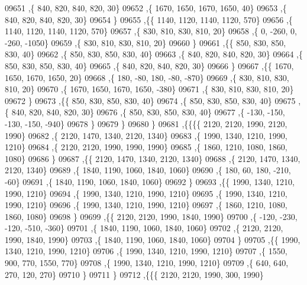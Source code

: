 \begin{DoxyCode}
09651     ,\{   840,   820,   840,   820,    30\}
09652     ,\{  1670,  1650,  1670,  1650,    40\}
09653     ,\{   840,   820,   840,   820,    30\}
09654     \}
09655    ,\{\{  1140,  1120,  1140,  1120,   570\}
09656     ,\{  1140,  1120,  1140,  1120,   570\}
09657     ,\{   830,   810,   830,   810,    20\}
09658     ,\{     0,  -260,     0,  -260, -1050\}
09659     ,\{   830,   810,   830,   810,    20\}
09660     \}
09661    ,\{\{   850,   830,   850,   830,    40\}
09662     ,\{   850,   830,   850,   830,    40\}
09663     ,\{   840,   820,   840,   820,    30\}
09664     ,\{   850,   830,   850,   830,    40\}
09665     ,\{   840,   820,   840,   820,    30\}
09666     \}
09667    ,\{\{  1670,  1650,  1670,  1650,    20\}
09668     ,\{   180,   -80,   180,   -80,  -870\}
09669     ,\{   830,   810,   830,   810,    20\}
09670     ,\{  1670,  1650,  1670,  1650,  -380\}
09671     ,\{   830,   810,   830,   810,    20\}
09672     \}
09673    ,\{\{   850,   830,   850,   830,    40\}
09674     ,\{   850,   830,   850,   830,    40\}
09675     ,\{   840,   820,   840,   820,    30\}
09676     ,\{   850,   830,   850,   830,    40\}
09677     ,\{  -130,  -150,  -130,  -150,  -940\}
09678     \}
09679    \}
09680   \}
09681  ,\{\{\{\{  2120,  2120,  1990,  2120,  1990\}
09682     ,\{  2120,  1470,  1340,  2120,  1340\}
09683     ,\{  1990,  1340,  1210,  1990,  1210\}
09684     ,\{  2120,  2120,  1990,  1990,  1990\}
09685     ,\{  1860,  1210,  1080,  1860,  1080\}
09686     \}
09687    ,\{\{  2120,  1470,  1340,  2120,  1340\}
09688     ,\{  2120,  1470,  1340,  2120,  1340\}
09689     ,\{  1840,  1190,  1060,  1840,  1060\}
09690     ,\{   180,    60,   180,  -210,   -60\}
09691     ,\{  1840,  1190,  1060,  1840,  1060\}
09692     \}
09693    ,\{\{  1990,  1340,  1210,  1990,  1210\}
09694     ,\{  1990,  1340,  1210,  1990,  1210\}
09695     ,\{  1990,  1340,  1210,  1990,  1210\}
09696     ,\{  1990,  1340,  1210,  1990,  1210\}
09697     ,\{  1860,  1210,  1080,  1860,  1080\}
09698     \}
09699    ,\{\{  2120,  2120,  1990,  1840,  1990\}
09700     ,\{  -120,  -230,  -120,  -510,  -360\}
09701     ,\{  1840,  1190,  1060,  1840,  1060\}
09702     ,\{  2120,  2120,  1990,  1840,  1990\}
09703     ,\{  1840,  1190,  1060,  1840,  1060\}
09704     \}
09705    ,\{\{  1990,  1340,  1210,  1990,  1210\}
09706     ,\{  1990,  1340,  1210,  1990,  1210\}
09707     ,\{  1550,   900,   770,  1550,   770\}
09708     ,\{  1990,  1340,  1210,  1990,  1210\}
09709     ,\{   640,   640,   270,   120,   270\}
09710     \}
09711    \}
09712   ,\{\{\{  2120,  2120,  1990,   300,  1990\}

\end{DoxyCode}
